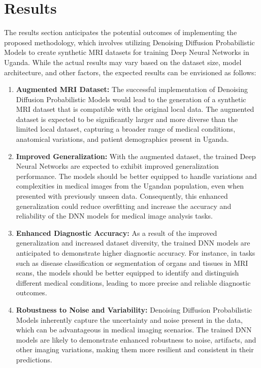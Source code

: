 \section*{Results}

The results section anticipates the potential outcomes of implementing the proposed methodology, which involves utilizing Denoising Diffusion Probabilistic Models to create synthetic MRI datasets for training Deep Neural Networks in Uganda. While the actual results may vary based on the dataset size, model architecture, and other factors, the expected results can be envisioned as follows:

\begin{enumerate}
    \item \textbf{Augmented MRI Dataset:} The successful implementation of Denoising Diffusion Probabilistic Models would lead to the generation of a synthetic MRI dataset that is compatible with the original local data. The augmented dataset is expected to be significantly larger and more diverse than the limited local dataset, capturing a broader range of medical conditions, anatomical variations, and patient demographics present in Uganda.

    \item \textbf{Improved Generalization:} With the augmented dataset, the trained Deep Neural Networks are expected to exhibit improved generalization performance. The models should be better equipped to handle variations and complexities in medical images from the Ugandan population, even when presented with previously unseen data. Consequently, this enhanced generalization could reduce overfitting and increase the accuracy and reliability of the DNN models for medical image analysis tasks.

    \item \textbf{Enhanced Diagnostic Accuracy:} As a result of the improved generalization and increased dataset diversity, the trained DNN models are anticipated to demonstrate higher diagnostic accuracy. For instance, in tasks such as disease classification or segmentation of organs and tissues in MRI scans, the models should be better equipped to identify and distinguish different medical conditions, leading to more precise and reliable diagnostic outcomes.

    \item \textbf{Robustness to Noise and Variability:} Denoising Diffusion Probabilistic Models inherently capture the uncertainty and noise present in the data, which can be advantageous in medical imaging scenarios. The trained DNN models are likely to demonstrate enhanced robustness to noise, artifacts, and other imaging variations, making them more resilient and consistent in their predictions.


\end{enumerate}
